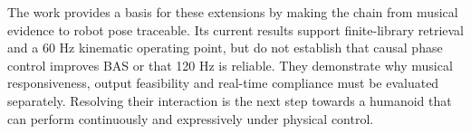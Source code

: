 The work provides a basis for these extensions by making the chain from musical
evidence to robot pose traceable. Its current results support finite-library
retrieval and a 60 Hz kinematic operating point, but do not establish that causal
phase control improves BAS or that 120 Hz is reliable. They demonstrate why
musical responsiveness, output feasibility and real-time compliance must be
evaluated separately. Resolving their interaction is the next step towards a
humanoid that can perform continuously and expressively under physical control.
